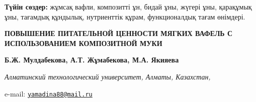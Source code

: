 {\bfseries Түйін сөздер:} жұмсақ вафли, композитті ұн, бидай ұны, жүгері
ұны, қарақұмық ұны, тағамдық құндылық, нутриенттік құрам, функционалдық
тағам өнімдері.

\begin{articleheader}
{\bfseries ПОВЫШЕНИЕ ПИТАТЕЛЬНОЙ ЦЕННОСТИ МЯГКИХ ВАФЕЛЬ С ИСПОЛЬЗОВАНИЕМ
КОМПОЗИТНОЙ МУКИ}

{\bfseries
Б.Ж. Мулдабекова,
А.Т. Жұмабекова,
М.А. Якияева\textsuperscript{\envelope }
}
\end{articleheader}

\begin{affiliation}
\emph{Алматинский технологический университет, Алматы, Казахстан,}

e-mail: \href{mailto:yamadina88@mail.ru}{\nolinkurl{yamadina88@mail.ru}}
\end{affiliation}

